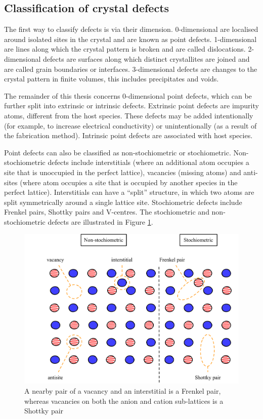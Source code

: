 \subsection{Classification of crystal defects}

The first way to classify defects is via their dimension. 0-dimensional are localised around isolated sites in the crystal and are known as point defects. 1-dimensional are lines along which the crystal pattern is broken and are called dislocations. 2-dimensional defects are surfaces along which distinct crystallites are joined and are called grain boundaries or interfaces. 3-dimensional defects are changes to the crystal pattern in finite volumes, this includes precipitates and voids. 

The remainder of this thesis concerns 0-dimensional point defects, which can be further split into extrinsic or intrinsic defects. Extrinsic point defects are impurity atoms, different from the host species. These defects may be added intentionally (for example, to increase electrical conductivity) or unintentionally (as a result of the fabrication method). Intrinsic point defects are associated with host species.

Point defects can also be classified as non-stochiometric or stochiometric. Non-stochiometric defects include interstitials (where an additional atom occupies a site that is unoccupied in the perfect lattice), vacancies (missing atoms) and anti-sites (where atom occupies a site that is occupied by another species in the perfect lattice). Interstitials can have a ``split'' structure, in which two atoms are split symmetrically around a single lattice site. Stochiometric defects include Frenkel pairs, Shottky pairs and V-centres. The stochiometric and non-stochiometric defects are illustrated in Figure \ref{classification}.

\begin{figure}[h]
\centering
  \includegraphics[width=1.0\columnwidth]{figures/ch3/classification.png}
  \caption[Classification of crystal point-defects]{A nearby pair of a vacancy and an interstitial is a Frenkel pair, whereas vacancies on both the anion and cation sub-lattices is a Shottky pair}
  \label{classification}
\end{figure}

